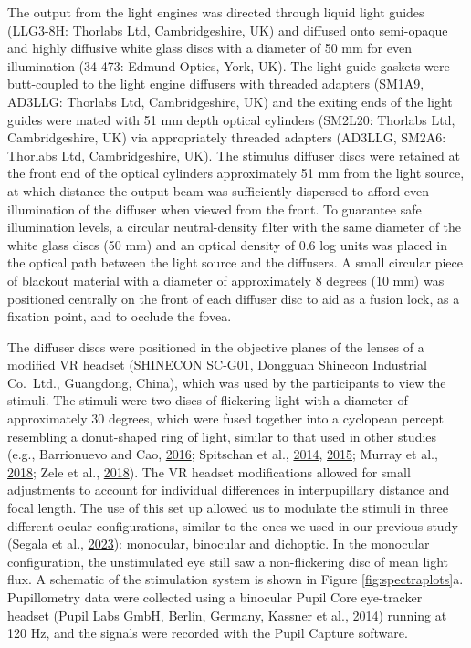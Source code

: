 \documentclass[
]{article}
\begin{document}
The output from the light engines was directed through liquid light guides (LLG3-8H: Thorlabs Ltd, Cambridgeshire, UK) and diffused onto semi-opaque and highly diffusive white glass discs with a diameter of 50 mm for even illumination (34-473: Edmund Optics, York, UK). The light guide gaskets were butt-coupled to the light engine diffusers with threaded adapters (SM1A9, AD3LLG: Thorlabs Ltd, Cambridgeshire, UK) and the exiting ends of the light guides were mated with 51 mm depth optical cylinders (SM2L20: Thorlabs Ltd, Cambridgeshire, UK) via appropriately threaded adapters (AD3LLG, SM2A6: Thorlabs Ltd, Cambridgeshire, UK). The stimulus diffuser discs were retained at the front end of the optical cylinders approximately 51 mm from the light source, at which distance the output beam was sufficiently dispersed to afford even illumination of the diffuser when viewed from the front. To guarantee safe illumination levels, a circular neutral-density filter with the same diameter of the white glass discs (50 mm) and an optical density of 0.6 log units was placed in the optical path between the light source and the diffusers. A small circular piece of blackout material with a diameter of approximately 8 degrees (10 mm) was positioned centrally on the front of each diffuser disc to aid as a fusion lock, as a fixation point, and to occlude the fovea.

The diffuser discs were positioned in the objective planes of the lenses of a modified VR headset (SHINECON SC-G01, Dongguan Shinecon Industrial Co.~Ltd., Guangdong, China), which was used by the participants to view the stimuli. The stimuli were two discs of flickering light with a diameter of approximately 30 degrees, which were fused together into a cyclopean percept resembling a donut-shaped ring of light, similar to that used in other studies (e.g., Barrionuevo and Cao, \protect\hyperlink{ref-Barrionuevo2016}{2016}; Spitschan et al., \protect\hyperlink{ref-Spitschan2014}{2014}, \protect\hyperlink{ref-Spitschan2015}{2015}; Murray et al., \protect\hyperlink{ref-Murray2018}{2018}; Zele et al., \protect\hyperlink{ref-Zele2018}{2018}). The VR headset modifications allowed for small adjustments to account for individual differences in interpupillary distance and focal length. The use of this set up allowed us to modulate the stimuli in three different ocular configurations, similar to the ones we used in our previous study (Segala et al., \protect\hyperlink{ref-Segala2023}{2023}): monocular, binocular and dichoptic. In the monocular configuration, the unstimulated eye still saw a non-flickering disc of mean light flux. A schematic of the stimulation system is shown in Figure \ref{fig:spectraplots}a. Pupillometry data were collected using a binocular Pupil Core eye-tracker headset (Pupil Labs GmbH, Berlin, Germany, Kassner et al., \protect\hyperlink{ref-Kassner2014}{2014}) running at 120 Hz, and the signals were recorded with the Pupil Capture software.
\end{document}
